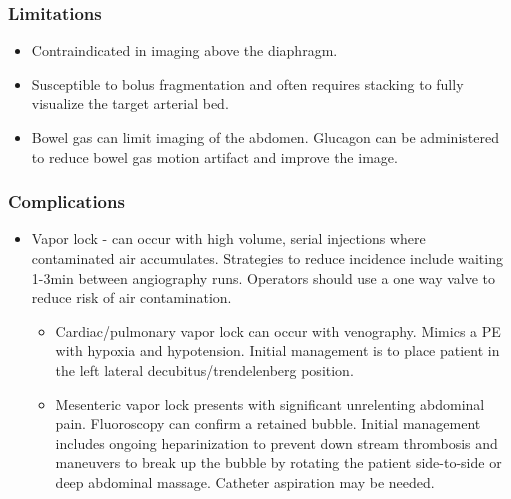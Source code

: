 \documentclass[
]{book}
\begin{document}
\hypertarget{limitations}{%
\subsubsection{Limitations}\label{limitations}}

\begin{itemize}
\item
  Contraindicated in imaging above the diaphragm.\citep{caridi1997, sharafuddin2017}
\item
  Susceptible to bolus fragmentation and often requires stacking to
  fully visualize the target arterial bed.\citep{caridi1997, sharafuddin2017}
\item
  Bowel gas can limit imaging of the abdomen. Glucagon can be
  administered to reduce bowel gas motion artifact and improve the
  image.\citep{caridi1997, cho2015, criado2012, sharafuddin2017}
\end{itemize}

\hypertarget{complications-3}{%
\subsubsection{Complications}\label{complications-3}}

\begin{itemize}
\item
  Vapor lock - can occur with high volume, serial injections where
  contaminated air accumulates. Strategies to reduce incidence include
  waiting 1-3min between angiography runs. Operators should use a one
  way valve to reduce risk of air contamination.\citep{cho2011, cho2015}

  \begin{itemize}
  \item
    Cardiac/pulmonary vapor lock can occur with venography. Mimics a
    PE with hypoxia and hypotension. Initial management is to place
    patient in the left lateral decubitus/trendelenberg
    position.\citep{caridi1997, sharafuddin2017}
  \item
    Mesenteric vapor lock presents with significant unrelenting
    abdominal pain. Fluoroscopy can confirm a retained bubble.
    Initial management includes ongoing heparinization to prevent
    down stream thrombosis and maneuvers to break up the bubble by
    rotating the patient side-to-side or deep abdominal massage.
    Catheter aspiration may be needed.\citep{caridi1997, sharafuddin2017}
  \end{itemize}
\end{itemize}

  
\end{document}
